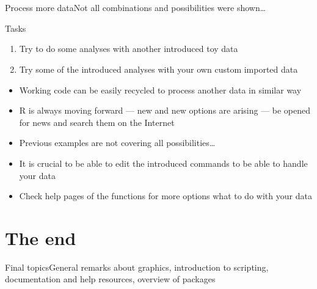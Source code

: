 \documentclass[compress, ucs, xelatex, 11pt, xcolor=svgnames,
	hyperref={
		bookmarks=true,
		unicode=true,
		colorlinks=true,
		pdftitle={Molecular data in R},
		plainpages=false,
		pdfauthor={Vojtech Zeisek},
		pdfsubject={Course about phylogeny and evolution in R},
		pdfcreator={XeLaTeX},
		pdfkeywords={R, evolution, phylogeny, molecular data},
		linkcolor=Tomato,
		anchorcolor=SaddleBrown,
		citecolor=Goldenrod,
		filecolor=DarkMagenta,
		menucolor=Sienna,
		urlcolor=DarkTurquoise,
		pdftex},
	url={hyphens, lowtilde} %
	]{beamer}
\begin{document}
%
%

\section{}

\begin{frame}{Process more data}{Not all combinations and possibilities were shown\ldots}
	\begin{block}{Tasks}
		\begin{enumerate}
			\item Try to do some analyses with another introduced toy data
			\item Try some of the introduced analyses with your own custom imported data
		\end{enumerate}
	\end{block}
	\begin{itemize}
		\item Working code can be easily recycled to process another data in similar way
		\item R is always moving forward --- new and new options are arising --- be opened for news and search them on the Internet
		\item Previous examples are not covering all possibilities\ldots
		\item It is crucial to be able to edit the introduced commands to be able to handle your data
		\item Check help pages of the functions for more options what to do with your data
	\end{itemize}
\end{frame}

\section{The end}

\begin{frame}{Final topics}{General remarks about graphics, introduction to scripting, documentation and help resources, overview of packages}
	\tableofcontents[currentsection, sectionstyle=show/hide, hideothersubsections]
\end{frame}
\end{document}
